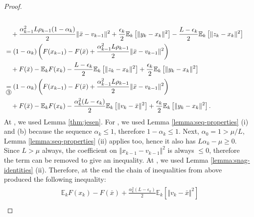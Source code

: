 \documentclass[12pt]{article}
\newcommand{\expect}{\ensuremath{\mathbb E}}
\begin{document}
\begin{proof}
{\begin{align*}
                \\&\quad 
                    + \frac{\alpha_{k - 1}^2L \rho_{k - 1}(1 - \alpha_k)}{2}\Vert \bar x - v_{k - 1}\Vert^2
                    + \frac{\epsilon_k}{2}\expect_k \left[\Vert y_k - x_k \Vert^2\right] 
                    - \frac{L - \epsilon_k}{2}\expect_k \left[\Vert z_k - x_k\Vert^2\right]
                \\&= 
                (1 - \alpha_k)\left(
                    F(x_{k - 1}) - F(\bar x)
                    + \frac{\alpha_{k - 1}^2L\rho_{k - 1}}{2}\Vert \bar x - v_{k - 1}\Vert^2
                \right)
                    \\ &\quad 
                    + F(\bar x) - \expect_kF(x_k) 
                    - \frac{L - \epsilon_k}{2}\expect_k \left[\Vert z_k - x_k\Vert^2\right]
                    + \frac{\epsilon_k}{2}\expect_k \left[\Vert y_k - x_k \Vert^2\right] 
                \\
                &\underset{\circled{3}}{=} 
                (1 - \alpha_k)\left(
                    F(x_{k - 1}) - F(\bar x)
                    + \frac{\alpha_{k - 1}^2L\rho_{k - 1}}{2}\Vert \bar x - v_{k - 1}\Vert^2
                \right)
                    \\ &\quad 
                    + F(\bar x) - \expect_kF(x_k) 
                    - \frac{\alpha_k^2(L - \epsilon_k)}{2}\expect_k \left[\Vert v_k - \bar x\Vert^2\right]
                    + \frac{\epsilon_k}{2}\expect_k \left[\Vert y_k - x_k \Vert^2\right]. 
            \end{align*}
            }
            At , we used Lemma \ref{thm:jesen}. 
            For , we used Lemma \ref{lemma:seq-properties} (i) and (b) because the sequence $\alpha_k \le 1$, therefore $1 - \alpha_k \le 1$. 
            Next, $\alpha_0 = 1 > \mu/L$, Lemma \ref{lemma:seq-properties} (ii) applies too, hence it also has $L\alpha_k - \mu \ge 0$. 
            Since $L > \mu$ always, the coefficient on $\Vert x_{k - 1} - v_{k - 1}\Vert^2$ is always $\le 0$, therefore the term can be removed to give an inequality. 
            At , we used Lemma \ref{lemma:snag-identities} (ii). 
            Therefore, at the end the chain of inequalities from above produced the following inequality: 
            \begin{align}\begin{split}
                & \expect_kF(x_k) - F(\bar x) 
                + \frac{\alpha_k^2(L - \epsilon_k)}{2}\expect_k \left[\Vert v_k - \bar x\Vert^2\right]
                \\

\end{split}
\end{align}
\end{proof}
\end{document}
